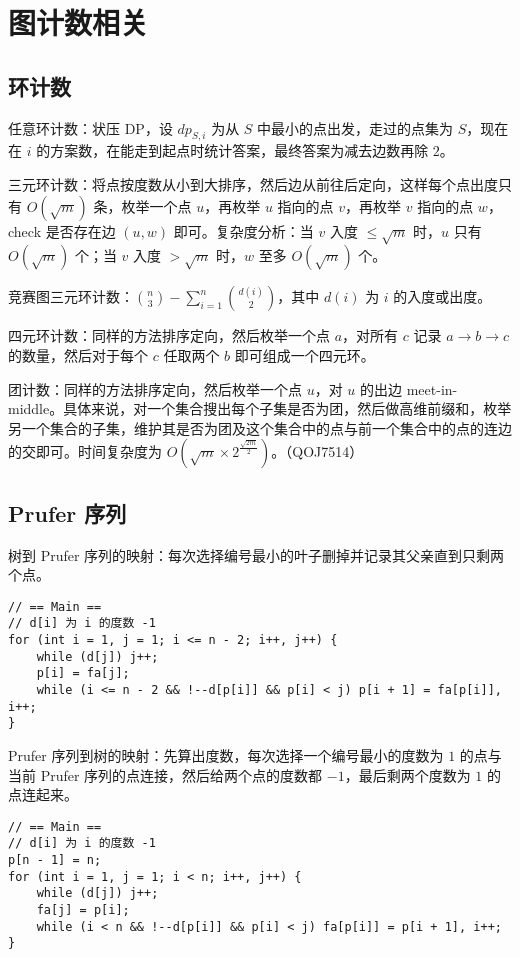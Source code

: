 \section{图计数相关}

\subsection{环计数}

任意环计数：状压 DP，设 $dp_{S, i}$ 为从 $S$ 中最小的点出发，走过的点集为 $S$，现在在 $i$ 的方案数，在能走到起点时统计答案，最终答案为减去边数再除 $2$。

三元环计数：将点按度数从小到大排序，然后边从前往后定向，这样每个点出度只有 $O(\sqrt{m})$ 条，枚举一个点 $u$，再枚举 $u$ 指向的点 $v$，再枚举 $v$ 指向的点 $w$，check 是否存在边 $(u, w)$ 即可。复杂度分析：当 $v$ 入度 $\le \sqrt{m}$ 时，$u$ 只有 $O(\sqrt{m})$ 个；当 $v$ 入度 $> \sqrt{m}$ 时，$w$ 至多 $O(\sqrt{m})$ 个。

竞赛图三元环计数：$\binom{n}{3} - \sum_{i = 1}^n \binom{d(i)}{2}$，其中 $d(i)$ 为 $i$ 的入度或出度。

四元环计数：同样的方法排序定向，然后枚举一个点 $a$，对所有 $c$ 记录 $a \to b \to c$ 的数量，然后对于每个 $c$ 任取两个 $b$ 即可组成一个四元环。

团计数：同样的方法排序定向，然后枚举一个点 $u$，对 $u$ 的出边 meet-in-middle。具体来说，对一个集合搜出每个子集是否为团，然后做高维前缀和，枚举另一个集合的子集，维护其是否为团及这个集合中的点与前一个集合中的点的连边的交即可。时间复杂度为 $O(\sqrt{m} \times 2^\frac{\sqrt{2m}}{2})$。（QOJ7514）

\subsection{Prufer 序列}

树到 Prufer 序列的映射：每次选择编号最小的叶子删掉并记录其父亲直到只剩两个点。

\begin{verbatim}
// == Main ==
// d[i] 为 i 的度数 -1
for (int i = 1, j = 1; i <= n - 2; i++, j++) {
    while (d[j]) j++;
    p[i] = fa[j];
    while (i <= n - 2 && !--d[p[i]] && p[i] < j) p[i + 1] = fa[p[i]], i++;
}
\end{verbatim}

Prufer 序列到树的映射：先算出度数，每次选择一个编号最小的度数为 $1$ 的点与当前 Prufer 序列的点连接，然后给两个点的度数都 $-1$，最后剩两个度数为 $1$ 的点连起来。

\begin{verbatim}
// == Main ==
// d[i] 为 i 的度数 -1
p[n - 1] = n;
for (int i = 1, j = 1; i < n; i++, j++) {
    while (d[j]) j++;
    fa[j] = p[i];
    while (i < n && !--d[p[i]] && p[i] < j) fa[p[i]] = p[i + 1], i++;
}
\end{verbatim}

